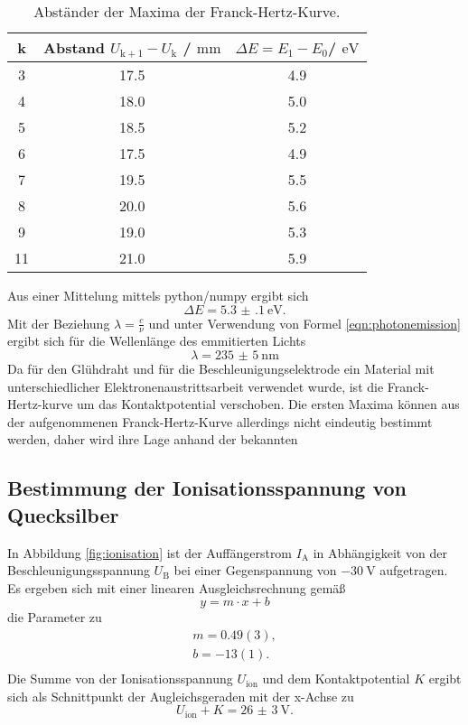 \begin{table}
	\centering
	\caption{Abständer der Maxima der Franck-Hertz-Kurve.}
	\label{tab:hertzchen}
	\begin{tabular}{ccc}
		\toprule
		k& Abstand $U_{\mathrm{k+1}}-U_{\mathrm{k}}$ / $\si{\milli\meter}$ & $\Delta E=E_1 - E_0$/ $\si{\electronvolt}$ \\
		\midrule
3&17.5 & 4.9\\
4&18.0 & 5.0\\
5&18.5 & 5.2\\
6&17.5 & 4.9\\
7&19.5 & 5.5\\
8&20.0 & 5.6\\
9&19.0 & 5.3\\
11&21.0 & 5.9\\
\end{tabular}
\end{table}

Aus einer Mittelung mittels python/numpy \cite{numpy} ergibt sich
\begin{equation}
	\Delta E=\SI{5.3(1)}{\electronvolt} \mathrm{.}
\end{equation}
Mit der Beziehung $\lambda=\frac{c}{\nu}$ und unter Verwendung von Formel
\eqref{eqn:photonemission} ergibt sich für die Wellenlänge des emmitierten Lichts
\begin{equation}
	\lambda=\SI{235(5)}{\nano\meter}
\end{equation}
Da für den Glühdraht und für die Beschleunigungselektrode ein Material mit unterschiedlicher Elektronenaustrittsarbeit verwendet wurde, ist die Franck-Hertz-kurve um das Kontaktpotential verschoben.
Die ersten Maxima können aus der aufgenommenen Franck-Hertz-Kurve allerdings nicht eindeutig bestimmt werden, daher wird ihre Lage anhand der bekannten

\FloatBarrier
\subsection{Bestimmung der Ionisationsspannung von Quecksilber}
In Abbildung \ref{fig:ionisation} ist der Auffängerstrom $I_{\mathrm{A}}$ in Abhängigkeit
von der Beschleunigungsspannung $U_{\mathrm{B}}$ bei einer Gegenspannung von $-\SI{30}{\volt}$
aufgetragen.
Es ergeben sich mit einer linearen Ausgleichsrechnung gemäß
\begin{equation*}
	y = m \cdot x + b
\end{equation*}
die Parameter zu
\begin{gather*}
	m = 0.49(3) \mathrm{,} \\
	b = -13(1) \mathrm{.}  \\
\end{gather*}
Die Summe von der Ionisationsspannung $U_{\mathrm{ion}}$ und dem Kontaktpotential $K$ ergibt
sich als Schnittpunkt der Augleichsgeraden mit der x-Achse zu
\begin{equation*}
	U_{\mathrm{ion}} + K = \SI{26(3)}{\volt} \mathrm{.}
\end{equation*}
